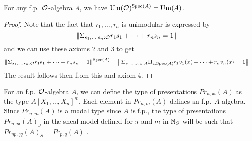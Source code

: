     \begin{lemma}\label{Um}
      For any f.p.\ $\mathcal O$-algebra $A$, we have $\mathrm{Um}(\mathcal O)^{\operatorname{Spec}(A)} = \mathrm{Um}(A)$.
    \end{lemma}

    \begin{proof}
      Note that the fact that $r_1,\dots,r_n$ is unimodular is expressed by
      $$\left\lVert \Sigma_{s_1,\dots,s_n:\mathcal O}r_1s_1+\dots+r_ns_n = 1 \right\rVert$$
      and we can use these axioms 2 and 3 to get
      $$\left\lVert \Sigma_{s_1,\dots,s_n:\mathcal O}r_1s_1+\dots+r_ns_n = 1 \right\rVert^{\operatorname{Spec}(A)} = \left\lVert \Sigma_{v_1,\dots,v_n:A}\Pi_{x:\operatorname{Spec}(A)}r_1v_1(x)+\dots+r_nv_n(x) = 1 \right\rVert$$
      The result follows then from this and axiom 4.
    \end{proof}      





    
    For an f.p.\ $\mathcal O$-algebra $A$, we can define the type of presentations $Pr_{n,m}(A)$ as the type $A[X_1,\dots,X_n]^m$.
    Each element in $Pr_{n,m}(A)$ defines an
    f.p.\ $A$-algebra. Since $Pr_{n,m}(A)$ is a modal type since $A$ is f.p., the type of presentations $Pr_{n,m}(A)_S$ in the sheaf model
    defined for $n$ and $m$ in $\mathbb{N}_S$ will be such that $Pr_{\eta p,\eta q}(A)_S = Pr_{p,q}(A)$ \cite{CRS21}.
    
